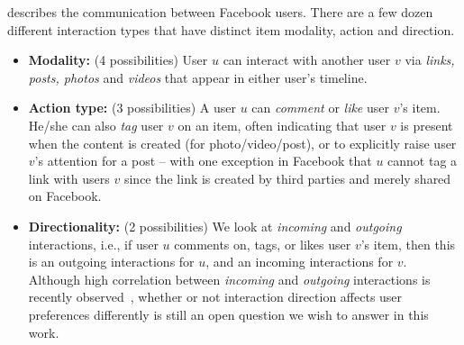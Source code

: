  describes the communication between Facebook users. There are a few dozen different interaction types that have distinct item modality, action and direction.
\begin{itemize}
\item \textbf{Modality:} (4 possibilities)
User $u$ can interact with another user $v$ via \textit{links, posts, photos} and \textit{videos} that appear in either user's timeline.

\item \textbf{Action type:} (3 possibilities)
A user $u$ can \textit{comment} or \textit{like} 
user $v$'s item. He/she can also \textit{tag} user $v$ on an 
item, often indicating that user $v$ is present when the content is created (for photo/video/post), 
or to explicitly raise user $v$'s attention for a post -- with one exception in Facebook that $u$ cannot tag a link with users $v$ since the link is created by third parties and merely shared on Facebook.

\item \textbf{Directionality:} (2 possibilities)
We look at \textit{incoming} and \textit{outgoing} interactions, i.e.,
if user $u$ comments on, tags, or likes user $v$'s item,
then this is an outgoing interactions for $u$, and an incoming interactions for $v$.
Although high correlation between \textit{incoming} and \textit{outgoing} interactions 
is recently observed~\cite{saez2011high}, whether or not interaction direction 
affects user preferences differently is still an open question we wish to answer
in this work. 
      								
\end{itemize}

